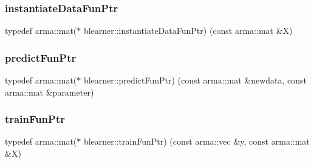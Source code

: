 \subsubsection{\texorpdfstring{instantiate\+Data\+Fun\+Ptr}{instantiateDataFunPtr}}
{\footnotesize\ttfamily typedef arma\+::mat($\ast$ blearner\+::instantiate\+Data\+Fun\+Ptr) (const arma\+::mat \&X)}

\mbox{\label{namespaceblearner_a93d5b51440d434704d2bde9dee652f6e}} 
\subsubsection{\texorpdfstring{predict\+Fun\+Ptr}{predictFunPtr}}
{\footnotesize\ttfamily typedef arma\+::mat($\ast$ blearner\+::predict\+Fun\+Ptr) (const arma\+::mat \&newdata, const arma\+::mat \&parameter)}

\mbox{\label{namespaceblearner_a5e2b38edf05e32681bee136af9ae505d}} 
\subsubsection{\texorpdfstring{train\+Fun\+Ptr}{trainFunPtr}}
{\footnotesize\ttfamily typedef arma\+::mat($\ast$ blearner\+::train\+Fun\+Ptr) (const arma\+::vec \&y, const arma\+::mat \&X)}

